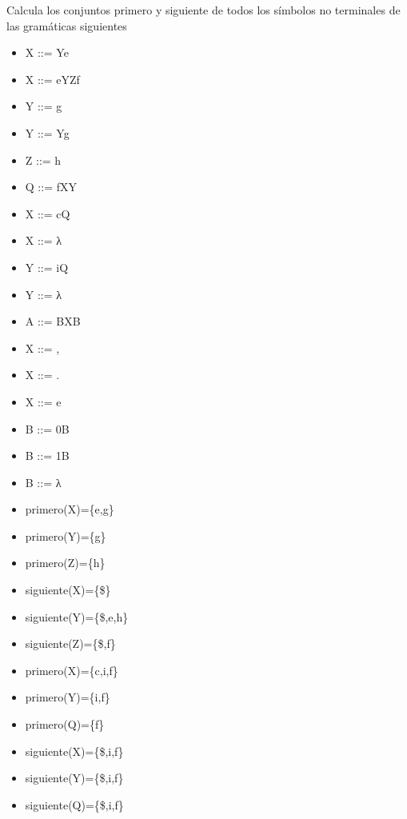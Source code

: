 \documentclass[nochap]{apuntes}
\begin{document}
\begin{problem}
Calcula los conjuntos primero y siguiente de todos los símbolos no terminales de las gramáticas siguientes

\ppart
\begin{itemize}
\item X ::= Ye
\item X ::= eYZf
\item Y ::= g
\item Y ::= Yg
\item Z ::= h
\end{itemize}

\ppart
\begin{itemize}
\item Q ::= fXY
\item X ::= cQ
\item X ::= λ
\item Y ::= iQ
\item Y ::= λ
\end{itemize}

\ppart
\begin{itemize}
\item A ::= BXB
\item X ::= ,
\item X ::= .
\item X ::= e
\item B ::= 0B
\item B ::= 1B
\item B ::= λ
\end{itemize}

\solution
\ppart
\begin{itemize}
\item primero(X)=\{e,g\}
\item primero(Y)=\{g\}
\item primero(Z)=\{h\}
\end{itemize}
\begin{itemize}
\item siguiente(X)=\{\$\}
\item siguiente(Y)=\{\$,e,h\}
\item siguiente(Z)=\{\$,f\}
\end{itemize}

\ppart
\begin{itemize}
\item primero(X)=\{c,i,f\}
\item primero(Y)=\{i,f\}
\item primero(Q)=\{f\}
\end{itemize}
\begin{itemize}
\item siguiente(X)=\{\$,i,f\}
\item siguiente(Y)=\{\$,i,f\}
\item siguiente(Q)=\{\$,i,f\}
\end{itemize}


\end{problem}
\end{document}

